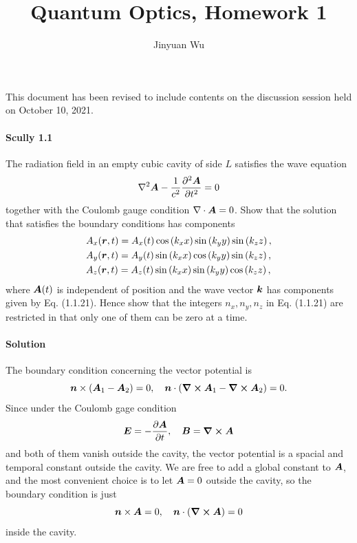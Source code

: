 \documentclass[hyperref, a4paper]{article}
\title{Quantum Optics, Homework 1}
\author{Jinyuan Wu}
\begin{document}
\maketitle

This document has been revised to include contents on the discussion session held on October 10, 2021.

\paragraph{}

\paragraph{Scully 1.1} The radiation field in an empty cubic cavity of side $L$ satisfies the wave equation
\begin{equation}
    \nabla^{2} \vb*{A}-\frac{1}{c^{2}} \frac{\partial^{2} \vb*{A}}{\partial t^{2}}=0
    \label{eq:scully-1-1-1}
\end{equation}
together with the Coulomb gauge condition $\nabla \cdot \vb*{A}=0$. Show that the solution that satisfies the boundary conditions has components
\begin{equation}
    \begin{aligned}
        &A_{x}(\vb*{r}, t)=A_{x}(t) \cos \left(k_{x} x\right) \sin \left(k_{y} y\right) \sin \left(k_{z} z\right), \\
        &A_{y}(\vb*{r}, t)=A_{y}(t) \sin \left(k_{x} x\right) \cos \left(k_{y} y\right) \sin \left(k_{z} z\right), \\
        &A_{z}(\vb*{r}, t)=A_{z}(t) \sin \left(k_{x} x\right) \sin \left(k_{y} y\right) \cos \left(k_{z} z\right),
        \end{aligned}
    \label{eq:scully-1-1-2}
\end{equation}
where $\vb*{A}(t)$ is independent of position and the wave vector $\vb*{k}$ has components given by Eq. (1.1.21). Hence show that the integers $n_{x}, n_{y}, n_{z}$ in Eq. (1.1.21) are restricted in that only one of them can be zero at a time.

\paragraph{Solution} The boundary condition concerning the vector potential is
\[
    \vb*{n} \times (\vb*{A}_1 - \vb*{A}_2) = 0, \quad \vb*{n} \cdot (\curl{\vb*{A}_1} - \curl{\vb*{A}_2}) = 0.
\]
Since under the Coulomb gage condition
\[
    \vb*{E} = - \pdv{\vb*{A}}{t}, \quad \vb*{B} = \curl{\vb*{A}}
\]
and both of them vanish outside the cavity, the vector potential is a spacial and temporal constant outside the cavity.
We are free to add a global constant to $\vb*{A}$, and the most convenient choice is to let $\vb*{A} = 0$ outside the cavity, so the boundary condition is just
\[
    \vb*{n} \times \vb*{A} = 0, \quad \vb*{n} \cdot (\curl{\vb*{A}}) = 0
\]
inside the cavity.
\end{document}
